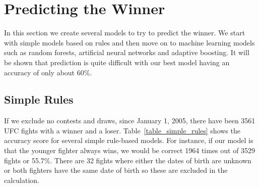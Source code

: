 \clearpage
\section{Predicting the Winner}

In this section we create several models to try to predict
the winner. We start with simple models based on rules
and then move on to machine learning models such as
random forests, artificial neural networks and
adaptive boosting. It will be shown that prediction is quite
difficult with our best model having an accuracy of
only about 60\%.

\subsection*{Simple Rules}

If we exclude no contests and draws, since January 1, 2005,
there have been 3561 UFC fights with a winner and a loser.
Table~\ref{table_simple_rules} shows the accuracy score
for several simple rule-based models. For instance, if
our model is that the younger fighter always wins, we would
be correct 1964 times out of 3529 fights or 55.7\%.
There are 32 fights where either the dates of birth
are unknown or both fighters have the same date of birth so
these are excluded in the calculation.

